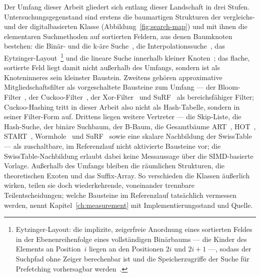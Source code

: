 \begin{nurlang}
Der Umfang dieser Arbeit gliedert sich entlang dieser Landschaft in drei Stufen. Untersuchungsgegenstand
sind erstens die baumartigen Strukturen der vergleichs- und der digitalbasierten Klasse
(Abbildung~\ref{fig:search-map}) und mit ihnen die elementaren Suchmethoden auf sortierten Feldern, aus
denen Baumknoten bestehen: die Binär- und die k-äre Suche~\cite{knuth1998taocp3,schlegel2009kary}, die
Interpolationssuche~\cite{perl1978interpolation}, das
Eytzinger-Layout~\cite{khuong2017eytzinger}\footnote{Eytzinger-Layout: die implizite, zeigerfreie
Anordnung eines sortierten Feldes in der Ebenenreihenfolge eines vollständigen Binärbaums --- die Kinder
des Elements an Position~$i$ liegen an den Positionen $2i$ und $2i+1$ ---, sodass der Suchpfad ohne Zeiger
berechenbar ist und die Speicherzugriffe der Suche für Prefetching vorhersagbar
werden~\cite{khuong2017eytzinger}.} und die lineare Suche innerhalb kleiner Knoten~\cite{leis2013art};
das flache, sortierte Feld liegt damit nicht außerhalb des Umfangs, sondern ist als Knoteninneres sein
kleinster Baustein. Zweitens gehören approximative Mitgliedschaftsfilter als vorgeschaltete Bausteine
zum Umfang --- der Bloom-Filter~\cite{bloom1970}, der Cuckoo-Filter~\cite{fan2014cuckoo}, der
Xor-Filter~\cite{graf2020xor} und SuRF~\cite{zhang2018surf} als bereichsfähiger Filter; Cuckoo-Hashing
tritt in dieser Arbeit also nicht als Hash-Tabelle, sondern in seiner Filter-Form auf. Drittens liegen
weitere Vertreter --- die Skip-Liste, die Hash-Suche, der binäre Suchbaum, der B-Baum, die Gesamtbäume
ART~\cite{leis2013art}, HOT~\cite{binna2018hot}, START~\cite{fent2020start},
Wormhole~\cite{wu2019wormhole} und SuRF~\cite{zhang2018surf} sowie eine skalare Nachbildung der
SwissTable --- als zuschaltbare, im Referenzlauf nicht aktivierte Bausteine vor; die
SwissTable-Nachbildung erlaubt dabei keine Messaussage über die SIMD-basierte Vorlage. Außerhalb des
Umfangs bleiben die räumlichen Strukturen, die theoretischen Exoten und das Suffix-Array. So verschieden
die Klassen äußerlich wirken, teilen sie doch wiederkehrende, voneinander trennbare Teilentscheidungen;
welche Bausteine im Referenzlauf tatsächlich vermessen werden, nennt Kapitel~\ref{ch:measurement} mit
Implementierungsstand und Quelle.
\end{nurlang}
